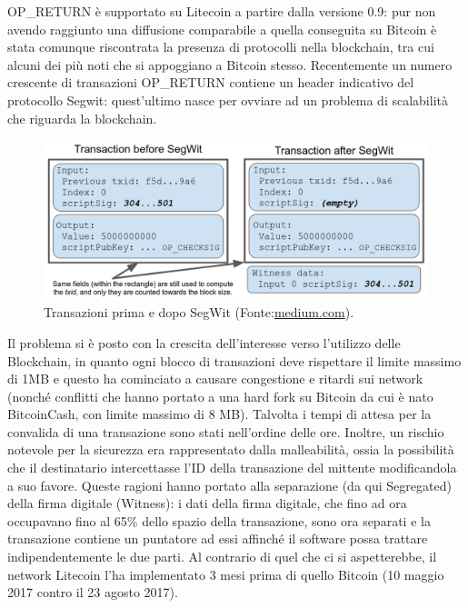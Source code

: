 OP\_RETURN è supportato su Litecoin a partire dalla versione 0.9: pur non avendo raggiunto una diffusione comparabile a quella conseguita su Bitcoin è stata comunque riscontrata la presenza di protocolli nella blockchain, tra cui alcuni dei più noti che si appoggiano a Bitcoin stesso.
Recentemente un numero crescente di transazioni OP\_RETURN contiene un header indicativo del protocollo Segwit: quest’ultimo nasce per ovviare ad un problema di scalabilità che riguarda la blockchain.

\begin{figure}[h!]
	\centering
	\includegraphics[width=1.0\linewidth]{images/before-after-segwit-medium}
	\caption{Transazioni prima e dopo SegWit (Fonte:\url{medium.com}).}
	\label{fig:before-after-segwit-medium}
\end{figure}


Il problema si è posto con la crescita dell’interesse verso l’utilizzo delle Blockchain, in quanto ogni blocco di transazioni deve rispettare il limite massimo di 1MB e questo ha cominciato a causare congestione e ritardi sui network (nonché conflitti che hanno portato a una hard fork su Bitcoin da cui è nato BitcoinCash, con limite massimo di 8 MB). Talvolta i tempi di attesa per la convalida di una transazione sono stati nell’ordine delle ore. Inoltre, un rischio notevole per la sicurezza era rappresentato dalla malleabilità, ossia la possibilità che il destinatario intercettasse l’ID della transazione del mittente modificandola a suo favore. Queste ragioni hanno portato alla separazione (da qui Segregated) della firma digitale (Witness): i dati della firma digitale, che fino ad ora occupavano fino al 65\% dello spazio della transazione, sono ora separati e la transazione contiene un puntatore ad essi affinché il software possa trattare indipendentemente le due parti. Al contrario di quel che ci si aspetterebbe, il network Litecoin l'ha implementato 3 mesi prima di quello Bitcoin (10 maggio 2017 contro il 23 agosto 2017).



